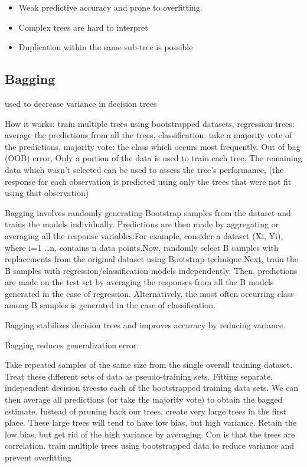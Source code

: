 \documentclass[]{book}
\begin{document}
\begin{itemize}
\item
  Weak predictive accuracy and prone to overfitting.
\item
  Complex trees are hard to interpret
\item
  Duplication within the same sub-tree is possible
\end{itemize}

\hypertarget{bagging}{%
\subsection{Bagging}\label{bagging}}

used to decrease variance in decision trees

How it works: train multiple trees using bootstrapped datasets, regression trees: average the predictions from all the trees, classification: take a majority vote of the predictions, majority vote: the class which occurs most frequently, Out of bag (OOB) error, Only a portion of the data is used to train each tree, The remaining data which wasn't selected can be used to assess the tree's performance, (the response for each observation is predicted using
only the trees that were not fit using that observation)

Bagging involves randomly generating Bootstrap samples from the dataset and trains the models individually. Predictions are then made by aggregating or averaging all the response variables:For example, consider a dataset (Xi, Yi), where i=1 \ldots{}n, contains n data points.Now, randomly select B samples with replacements from the original dataset using Bootstrap technique.Next, train the B samples with regression/classification models independently. Then, predictions are made on the test set by averaging the responses from all the B models generated in the case of regression. Alternatively, the most often occurring class among B samples is generated in the case of classification.

Bagging stabilizes decision trees and improves accuracy by reducing variance.

Bagging reduces generalization error.

Take repeated samples of the same size from the single overall training dataset. Treat these different sets of data as pseudo-training sets. Fitting separate, independent decision treesto each of the bootstrapped training data sets. We can then average all predictions (or take the majority vote) to obtain the bagged estimate. Instead of pruning back our trees, create very large trees in the first place. These large trees will tend to have low bias, but high variance. Retain the low bias, but get rid of the high variance by averaging. Con is that the trees are correlation.
train multiple trees using bootstrapped data to reduce variance and prevent overfitting
\end{document}
